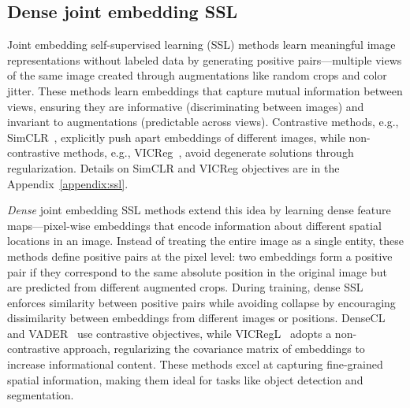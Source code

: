 \subsection{Dense joint embedding SSL}
\label{subsec:ssl}

Joint embedding self-supervised learning (SSL) methods learn meaningful image representations without labeled data by generating positive pairs—multiple views of the same image created through augmentations like random crops and color jitter. These methods learn embeddings that capture mutual information between views, ensuring they are informative (discriminating between images) and invariant to augmentations (predictable across views). Contrastive methods, e.g., SimCLR~\cite{simclr}, explicitly push apart embeddings of different images, while non-contrastive methods, e.g., VICReg~\cite{vicreg}, avoid degenerate solutions through regularization. Details on SimCLR and VICReg objectives are in the Appendix~\ref{appendix:ssl}.

\emph{Dense} joint embedding SSL methods extend this idea by learning dense feature maps—pixel-wise embeddings that encode information about different spatial locations in an image. Instead of treating the entire image as a single entity, these methods define positive pairs at the pixel level: two embeddings form a positive pair if they correspond to the same absolute position in the original image but are predicted from different augmented crops. During training, dense SSL enforces similarity between positive pairs while avoiding collapse by encouraging dissimilarity between embeddings from different images or positions. DenseCL~\cite{dense_cl} and VADER~\cite{vader} use contrastive objectives, while VICRegL~\cite{vicregl} adopts a non-contrastive approach, regularizing the covariance matrix of embeddings to increase informational content. These methods excel at capturing fine-grained spatial information, making them ideal for tasks like object detection and segmentation.

